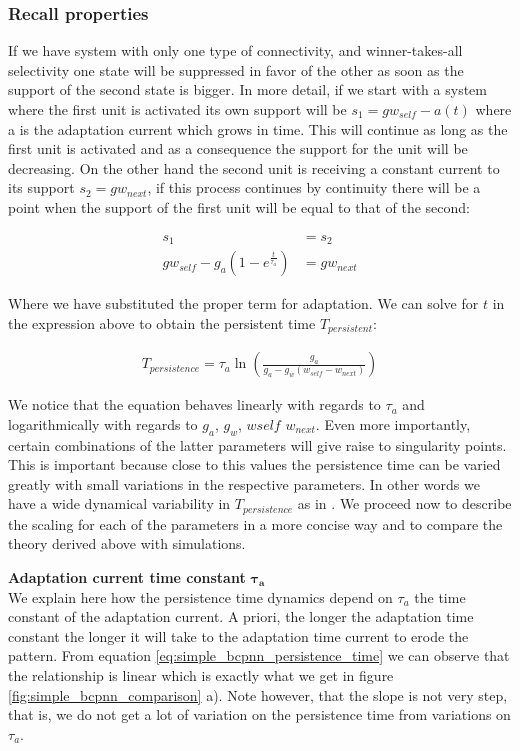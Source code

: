 \documentclass[10pt,a4paper]{article}
\begin{document}
\subsubsection{Recall properties}
If we have system with only one type of connectivity, and winner-takes-all selectivity one state will be suppressed in favor of the other as soon as the support of the second state is bigger. In more detail, if we start with a system where the first unit is activated its own support will be $s_1 = g w_{self} - a(t)$ where a is the adaptation current which grows in time. This will continue as long as the first unit is activated and as a consequence the support for the unit will be decreasing. On the other hand the second unit is receiving a constant current to its support $s_2 = g w_{next}$, if this process continues by continuity there will be a point when the support of the first unit will be equal to that of the second:

\begin{align*}
s_1 &= s_2 \\
gw_{self} - g_{a} (1 - e^{\frac{t}{\tau_a}}) &=  g w_{next}
\end{align*}


Where we have substituted the proper term for adaptation. We can solve for $t$ in the expression above to obtain the persistent time $T_{persistent}$:

\begin{align}
T_{persistence} = \tau_{a} \ln \left(\frac{g_a}{g_a - g_w (w_{self}  - w_{next})} \right) \label{eq:simple_bcpnn_persistence_time}
\end{align}

We notice that the equation behaves linearly with regards to $\tau_a$ and logarithmically with regards to $g_a$, $g_w$, $w{self}$ $w_{next}$. Even more importantly, certain combinations of the latter parameters will give raise to singularity points. This is important because close to this values the persistence time can be varied greatly with small variations in the respective parameters. In other words we have a wide dynamical variability in $T_{persistence}$ as in \cite{murray2017learning}. We proceed now to describe the scaling for each of the parameters in a more concise way and to compare the theory derived above with simulations. 

\textbf{Adaptation current time constant} $\mathbf{\tau_{a}}$ \\
We explain here how the persistence time dynamics depend on $\tau_a$ the time constant of the adaptation current. A priori, the longer the adaptation time constant the longer it will take to the adaptation time current to erode the pattern. From equation \ref{eq:simple_bcpnn_persistence_time} we can observe that the relationship is linear which is exactly what we get in figure \ref{fig:simple_bcpnn_comparison} a).  Note however, that the slope is not very step, that is, we do not get a lot of variation on the persistence time from variations on $\tau_a$. 
\end{document}
